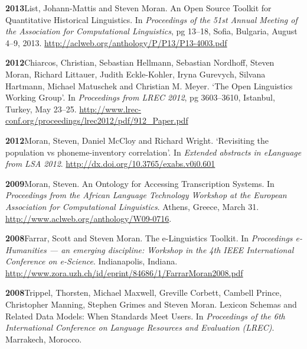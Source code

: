 \documentclass[11pt]{article}
\newcommand{\hangpara}{
 \setlength{\parindent}{0in} %
 \hangindent=0.42in %
}
\begin{document}
\vskip 6pt
\hangpara
{\bf 2013}\hspace{1ex}List, Johann-Mattis and Steven Moran. An Open Source Toolkit for Quantitative Historical Linguistics. In {\it Proceedings of the 51st Annual Meeting of the Association for Computational Linguistics}, pg 13--18, Sofia, Bulgaria, August 4--9, 2013. \url{http://aclweb.org/anthology/P/P13/P13-4003.pdf}


\vskip 6pt
\hangpara
{\bf 2012}\hspace{1ex}Chiarcos, Christian, Sebastian Hellmann, Sebastian Nordhoff, Steven Moran, Richard Littauer, Judith Eckle-Kohler, Iryna Gurevych, Silvana Hartmann, Michael Matuschek and Christian M. Meyer.  `The Open Linguistics Working Group'. In {\it Proceedings from LREC 2012}, pg 3603--3610, Istanbul, Turkey, May 23--25. \url{http://www.lrec-conf.org/proceedings/lrec2012/pdf/912_Paper.pdf}

\vskip 6pt
\hangpara
{\bf 2012}\hspace{1ex}Moran, Steven, Daniel McCloy and Richard Wright. `Revisiting the population vs phoneme-inventory correlation'. In {\it Extended abstracts in eLanguage from LSA 2012}. \url{http://dx.doi.org/10.3765/exabs.v0i0.601}

\vskip 6pt
\hangpara
{\bf 2009}\hspace{1ex}Moran, Steven. An Ontology for Accessing Transcription Systems. In {\it Proceedings from the African Language Technology Workshop at the European Association for Computational Linguistics}. Athens, Greece, March 31. \url{http://www.aclweb.org/anthology/W09-0716}. %

\vskip 6pt
\hangpara
{\bf 2008}\hspace{1ex}Farrar, Scott and Steven Moran. The e-Linguistics Toolkit. In {\it Proceedings e-Humanities --- an emerging discipline: Workshop in the 4th IEEE International Conference on e-Science}. Indianapolis, Indiana. \url{http://www.zora.uzh.ch/id/eprint/84686/1/FarrarMoran2008.pdf}

\vskip 6pt
\hangpara
{\bf 2008}\hspace{1ex}Trippel, Thorsten, Michael Maxwell, Greville Corbett, Cambell Prince, Christopher Manning, Stephen Grimes and Steven Moran. Lexicon Schemas and Related Data Models: When Standards Meet Users. In {\it Proceedings of the 6th International Conference on Language Resources and Evaluation (LREC)}. Marrakech, Morocco.
\end{document}
